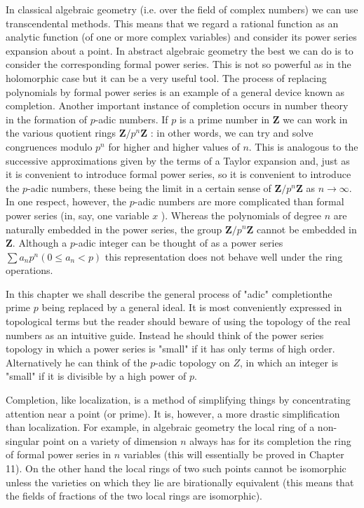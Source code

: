 \documentclass{standalone}
\theoremstyle{definition}
\theoremstyle{remark}
\begin{document}
In classical algebraic geometry (i.e. over the field of complex numbers) we can use transcendental methods. This means that we regard a rational function as an analytic function (of one or more complex variables) and consider its power series expansion about a point. In abstract algebraic geometry the best we can do is to consider the corresponding formal power series. This is not so powerful as in the holomorphic case but it can be a very useful tool. The process of replacing polynomials by formal power series is an example of a general device known as completion. Another important instance of completion occurs in number theory in the formation of $p$-adic numbers. If $p$ is a prime number in $\mathbf{Z}$ we can work in the various quotient rings $\mathbf{Z} / p^{n} \mathbf{Z}$ : in other words, we can try and solve congruences modulo $p^{n}$ for higher and higher values of $n$. This is analogous to the successive approximations given by the terms of a Taylor expansion and, just as it is convenient to introduce formal power series, so it is convenient to introduce the $p$-adic numbers, these being the limit in a certain sense of $\mathbf{Z} / p^{n} \mathbf{Z}$ as $n \rightarrow \infty$. In one respect, however, the $p$-adic numbers are more complicated than formal power series (in, say, one variable $x$ ). Whereas the polynomials of degree $n$ are naturally embedded in the power series, the group $\mathbf{Z} / p^{n} \mathbf{Z}$ cannot be embedded in $\mathbf{Z}$. Although a $p$-adic integer can be thought of as a power series $\sum a_{n} p^{n}\left(0 \leqslant a_{n}<p\right)$ this representation does not behave well under the ring operations.

In this chapter we shall describe the general process of "adic" completionthe prime $p$ being replaced by a general ideal. It is most conveniently expressed in topological terms but the reader should beware of using the topology of the real numbers as an intuitive guide. Instead he should think of the power series topology in which a power series is "small" if it has only terms of high order. Alternatively he can think of the $p$-adic topology on $Z$, in which an integer is "small" if it is divisible by a high power of $p$.

Completion, like localization, is a method of simplifying things by concentrating attention near a point (or prime). It is, however, a more drastic simplification than localization. For example, in algebraic geometry the local ring of a non-singular point on a variety of dimension $n$ always has for its completion the ring of formal power series in $n$ variables (this will essentially be proved in Chapter 11). On the other hand the local rings of two such points cannot be isomorphic unless the varieties on which they lie are birationally equivalent (this means that the fields of fractions of the two local rings are isomorphic).
\end{document}

